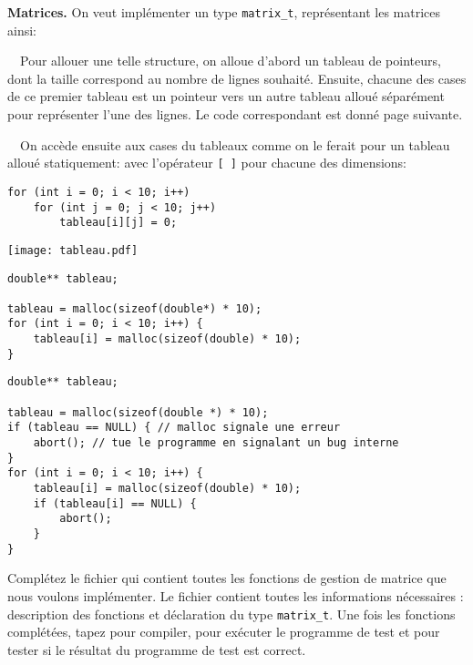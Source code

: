 \documentclass[10pt]{article}\usepackage[enonce]{exemptty}
\begin{document}
\begin{Exercice} \textbf{Matrices.}  On veut implémenter un type
  \texttt{matrix\_t}, représentant les matrices ainsi:
  
  \smallskip\noindent
  \begin{minipage}{.5\linewidth}%

    ~~Pour allouer une telle structure, on alloue d'abord un tableau de
    pointeurs, dont la taille correspond au nombre de lignes
    souhaité. Ensuite, chacune des cases de ce premier tableau est un
    pointeur vers un autre tableau alloué séparément pour représenter
    l'une des lignes. Le code correspondant est donné page suivante.

    \smallskip
    ~~On accède ensuite aux cases du tableaux comme on le ferait pour un
    tableau alloué statiquement: avec l'opérateur \verb~[ ]~ pour
    chacune des dimensions:

\begin{Verbatim}[label=Initialisation des éléments,numbers=right]    
for (int i = 0; i < 10; i++)
    for (int j = 0; j < 10; j++)
        tableau[i][j] = 0;
\end{Verbatim}

\end{minipage}\hfill\begin{minipage}{.48\linewidth}
  \texttt{[image: tableau.pdf]}
\end{minipage}
  
\begin{Verbatim}[label=Allocation d'un tableau de 10*10 doubles]
double** tableau;

tableau = malloc(sizeof(double*) * 10);
for (int i = 0; i < 10; i++) {
    tableau[i] = malloc(sizeof(double) * 10);
}
\end{Verbatim}

\begin{Verbatim}[label=Idem avec gestion des erreurs]
double** tableau;

tableau = malloc(sizeof(double *) * 10);
if (tableau == NULL) { // malloc signale une erreur
    abort(); // tue le programme en signalant un bug interne
}
for (int i = 0; i < 10; i++) {
    tableau[i] = malloc(sizeof(double) * 10);
    if (tableau[i] == NULL) {
        abort();
    }
}
\end{Verbatim}


  \Question Complétez le fichier  qui contient toutes les
  fonctions de gestion de matrice que nous voulons implémenter. Le fichier
   contient toutes les informations nécessaires : description
  des fonctions et déclaration du type \texttt{matrix\_t}. Une fois les fonctions
  complétées, tapez  pour compiler,
   pour exécuter le programme de test et  pour tester si le résultat du programme de test est correct.


\end{Exercice}
\end{document}
